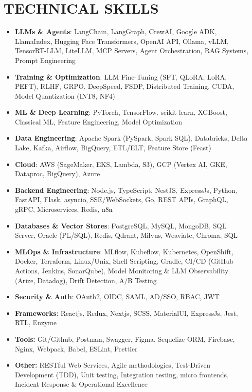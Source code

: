 \documentclass[a4paper]{article}
\begin{document}
\section*{TECHNICAL SKILLS}
\setlength{\arrayrulewidth}{1.2pt}
\begin{itemize}
\item \textbf{LLMs \& Agents}{: LangChain, LangGraph, CrewAI, Google ADK, LlamaIndex, Hugging Face Transformers, OpenAI API, Ollama, vLLM, TensorRT-LLM, LiteLLM, MCP Servers, Agent Orchestration, RAG Systems, Prompt Engineering}
\item \textbf{Training \& Optimization}{: LLM Fine-Tuning (SFT, QLoRA, LoRA, PEFT), RLHF, GRPO, DeepSpeed, FSDP, Distributed Training, CUDA, Model Quantization (INT8, NF4)}
\item \textbf{ML \& Deep Learning}{: PyTorch, TensorFlow, scikit-learn, XGBoost, Classical ML, Feature Engineering, Model Optimization}
\item \textbf{Data Engineering}{: Apache Spark (PySpark, Spark SQL), Databricks, Delta Lake, Kafka, Airflow, BigQuery, ETL/ELT, Feature Store (Feast)}
\item \textbf{Cloud}{: AWS (SageMaker, EKS, Lambda, S3), GCP (Vertex AI, GKE, Dataproc, BigQuery), Azure}
\item \textbf{Backend Engineering}{: Node.js, TypeScript, NestJS, ExpressJs, Python, FastAPI, Flask, asyncio, SSE/WebSockets, Go, REST APIs, GraphQL, gRPC, Microservices, Redis, n8n}
\item \textbf{Databases \& Vector Stores}{: PostgreSQL, MySQL, MongoDB, SQL Server, Oracle (PL/SQL), Redis, Qdrant, Milvus, Weaviate, Chroma, SQL}
\item \textbf{MLOps \& Infrastructure}{: MLflow, Kubeflow, Kubernetes, OpenShift, Docker, Terraform, Linux/Unix, Shell Scripting, Gradle, CI/CD (GitHub Actions, Jenkins, SonarQube), Model Monitoring \& LLM Observability (Arize, Datadog), Drift Detection, A/B Testing}
\item \textbf{Security \& Auth}{: OAuth2, OIDC, SAML, AD/SSO, RBAC, JWT}
\item \textbf{Frameworks:} Reactjs, Redux, Nextjs, SCSS, MaterialUI, ExpressJs, Jest, RTL, Enzyme
\item \textbf{Tools:} Git/Github, Postman, Swagger, Figma, Sequelize ORM, Firebase, Nginx, Webpack, Babel, ESLint, Prettier
\item \textbf{Other:} RESTful Web Services, Agile methodologies, Test-Driven Development (TDD), Unit testing, Integration testing, micro frontends, Incident Response \& Operational Excellence
\end{itemize}
\end{document}
